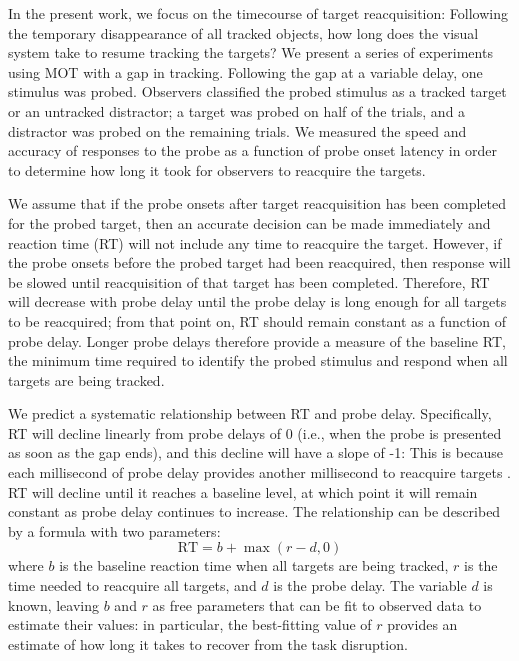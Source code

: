 \documentclass[jou,nobf]{apa}
\begin{document}
In the present work, we focus on the timecourse of target reacquisition:
Following the temporary disappearance of all tracked objects, how long does
the visual system take to resume tracking the targets?  We present a series
of experiments using MOT with a gap in tracking.  Following the gap at a
variable delay, one stimulus was probed.  Observers classified the probed
stimulus as a tracked target or an untracked distractor; a target was
probed on half of the trials, and a distractor was probed on the remaining
trials.  We measured the speed and accuracy of responses to the probe as a
function of probe onset latency in order to determine how long it took for
observers to reacquire the targets.

We assume that if the probe onsets after target reacquisition has been
completed for the probed target, then an accurate decision can be made
immediately and reaction time (RT) will not include any time to reacquire
the target.  However, if the probe onsets before the probed target had been
reacquired, then response will be slowed until reacquisition of that target
has been completed.  Therefore, RT will decrease with probe delay until the
probe delay is long enough for all targets to be reacquired; from that
point on, RT should remain constant as a function of probe delay.  Longer
probe delays therefore provide a measure of the baseline RT, the minimum
time required to identify the probed stimulus and respond when all targets
are being tracked.

We predict a systematic relationship between RT and probe delay.
Specifically, RT will decline linearly from probe delays of 0 (i.e., when
the probe is presented as soon as the gap ends), and this decline will have
a slope of -1: This is because each millisecond of probe delay provides
another millisecond to reacquire targets \cite<see for example>{Pashler1994}.
RT will decline until it reaches a baseline level, at which point it will
remain constant as probe delay continues to increase.  The relationship can
be described by a formula with two parameters:
\begin{equation}
  \label{eqn:model} \mathrm{RT} = b + \max\left(r - d, 0\right)
\end{equation}
where $b$ is the baseline reaction time when all targets are being tracked,
$r$ is the time needed to reacquire all targets, and $d$ is the probe
delay.  The variable $d$ is known, leaving $b$ and $r$ as free parameters
that can be fit to observed data to estimate their values: in particular,
the best-fitting value of $r$ provides an estimate of how long it takes to
recover from the task disruption.
\end{document}

